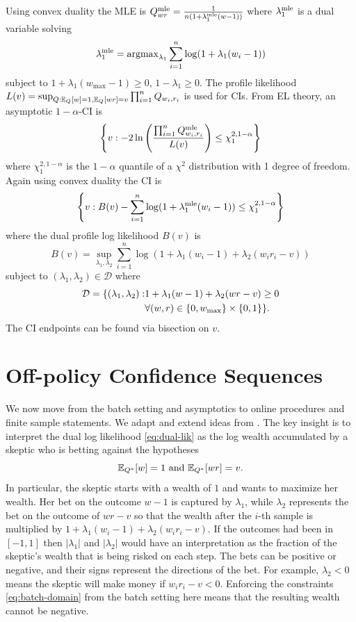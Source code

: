 Using convex duality the MLE is
$
Q^{\textrm{mle}}_{wr} = \frac{1}{n(1+\lambda_1^{\textrm{mle}}(w-1))}
$
where $\lambda_1^{\textrm{mle}}$ is a dual variable solving
\[
\lambda_1^{\textrm{mle}} = \operatorname{argmax}_{\lambda_1} \sum_{i=1}^n \log(1+\lambda_1(w_i-1))
\]
subject to $1+\lambda_1(w_{\max}-1)\geq 0$, $1-\lambda_1\geq 0$.
The profile likelihood
$
L(v)=\sup_{Q: \mathbb{E}_Q[w]=1, \mathbb{E}_Q[wr]=v} \prod_{i=1}^n Q_{w_i,r_i}
$
is used for CIs. From EL theory,
an asymptotic $1-\alpha$-CI is
\[
\left\{v: -2\ln\left(\frac{\prod_{i=1}^n Q^{\textrm{mle}}_{w_i,r_i}}{L(v)}\right)
\leq \chi_1^{2,1-\alpha}\right\}
\]
where $\chi_1^{2,1-\alpha}$ is the $1-\alpha$ quantile of a $\chi^2$
distribution with 1 degree of freedom.
Again using convex duality the CI is
\[
\left\{v: 
B(v)-\sum_{i=1}^n\log(1+\lambda_1^{\textrm{mle}}(w_i-1))
\leq \chi_1^{2,1-\alpha}\right\}
\]
where the dual profile log likelihood $B(v)$ is
\begin{equation}
B(v) = \sup_{\lambda_1,\lambda_2} \sum_{i=1}^n \log(1+\lambda_1(w_i-1)+\lambda_2(w_i r_i -v))    \label{eq:dual-lik}
\end{equation}
subject to $(\lambda_1,\lambda_2) \in \mathcal{D}$ where 
\begin{align}
\mathcal{D} =
\{(\lambda_1,\lambda_2): & 1+\lambda_1(w-1)+\lambda_2(wr-v)\geq 0 \label{eq:batch-domain}\\
                         & \forall (w,r) \in \{0,w_{\max}\}\times \{0,1\} \notag
\}.
\end{align}
The CI endpoints can be found via 
bisection on $v$.

\section{Off-policy Confidence Sequences}
We now move from the batch setting and asymptotics to
online procedures and finite sample statements.
We adapt and extend ideas from \cite{waudby-smith_variance-adaptive_2020}.
The key insight is to interpret the 
dual log likelihood \eqref{eq:dual-lik}
as the log wealth accumulated by a skeptic who is betting against the
hypotheses 
\[
\mathbb{E}_{Q^*}[w]=1 \text{ and } \mathbb{E}_{Q^*}[wr]=v.
\]
In particular,
the skeptic starts with a wealth of $1$ and wants to 
maximize her wealth. Her bet on the outcome $w-1$ is captured by $\lambda_1$, while $\lambda_2$
represents the bet on the outcome of $wr-v$ so that the wealth after
the $i$-th sample is multiplied by $1+\lambda_1(w_i-1)+\lambda_2 (w_i r_i -v)$. If the outcomes had been in $[-1,1]$ then
$|\lambda_1|$ and $|\lambda_2|$ would have an interpretation as 
the fraction of the skeptic's wealth that is being risked 
on each step. The bets can be positive
or negative, and their signs represent the directions of the bet. For example, $\lambda_2<0$ means 
the skeptic will make money if $w_ir_i-v<0$.
Enforcing the constraints 
\eqref{eq:batch-domain}
from the batch setting here means that 
the resulting wealth cannot be negative.



